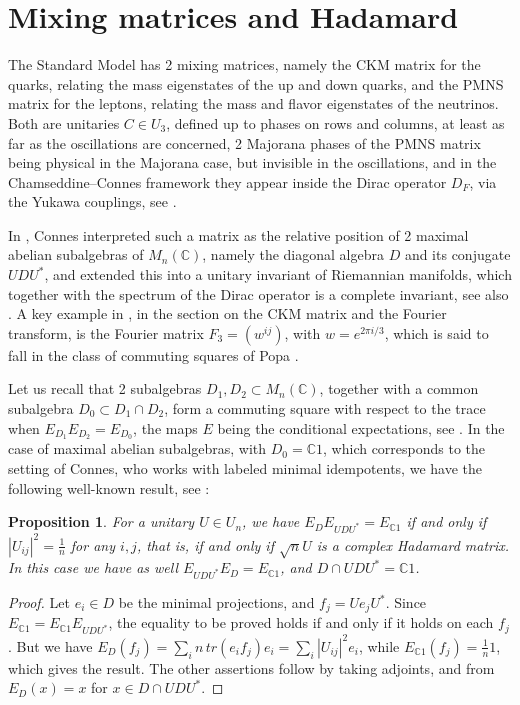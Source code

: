 \documentclass[11pt]{amsart}
\newtheorem{proposition}[theorem]{Proposition}
\theoremstyle{definition}
\begin{document}
\section{Mixing matrices and Hadamard}

The Standard Model has 2 mixing matrices, namely the CKM matrix for the quarks, relating the mass eigenstates of the up and down quarks, and the PMNS matrix for the leptons, relating the mass and flavor eigenstates of the neutrinos. Both are unitaries $C\in U_3$, defined up to phases on rows and columns, at least as far as the oscillations are concerned, 2 Majorana phases of the PMNS matrix being physical in the Majorana case, but invisible in the oscillations, and in the Chamseddine--Connes framework they appear inside the Dirac operator $D_F$, via the Yukawa couplings, see \cite{ccm,con}.

In \cite{co2}, Connes interpreted such a matrix as the relative position of 2 maximal abelian subalgebras of $M_n(\mathbb C)$, namely the diagonal algebra $D$ and its conjugate $UDU^*$, and extended this into a unitary invariant of Riemannian manifolds, which together with the spectrum of the Dirac operator is a complete invariant, see also \cite{co3}. A key example in \cite{co2}, in the section on the CKM matrix and the Fourier transform, is the Fourier matrix $F_3=(w^{ij})$, with $w=e^{2\pi i/3}$, which is said to fall in the class of commuting squares of Popa \cite{pop}.

Let us recall that 2 subalgebras $D_1,D_2\subset M_n(\mathbb C)$, together with a common subalgebra $D_0\subset D_1\cap D_2$, form a commuting square with respect to the trace when $E_{D_1}E_{D_2}=E_{D_0}$, the maps $E$ being the conditional expectations, see \cite{pop}. In the case of maximal abelian subalgebras, with $D_0=\mathbb C1$, which corresponds to the setting of Connes, who works with labeled minimal idempotents, we have the following well-known result, see \cite{haa,pop,tzy}:

\begin{proposition}
For a unitary $U\in U_n$, we have $E_DE_{UDU^*}=E_{\mathbb C1}$ if and only if $|U_{ij}|^2=\frac{1}{n}$ for any $i,j$, that is, if and only if $\sqrt{n}U$ is a complex Hadamard matrix. In this case we have as well $E_{UDU^*}E_D=E_{\mathbb C1}$, and $D\cap UDU^*=\mathbb C1$.
\end{proposition}

\begin{proof}
Let $e_i\in D$ be the minimal projections, and $f_j=Ue_jU^*$. Since $E_{\mathbb C1}=E_{\mathbb C1}E_{UDU^*}$, the equality to be proved holds if and only if it holds on each $f_j$. But we have $E_D(f_j)=\sum_in\,tr(e_if_j)e_i=\sum_i|U_{ij}|^2e_i$, while $E_{\mathbb C1}(f_j)=\frac{1}{n}1$, which gives the result. The other assertions follow by taking adjoints, and from $E_D(x)=x$ for $x\in D\cap UDU^*$.
\end{proof}
\end{document}
